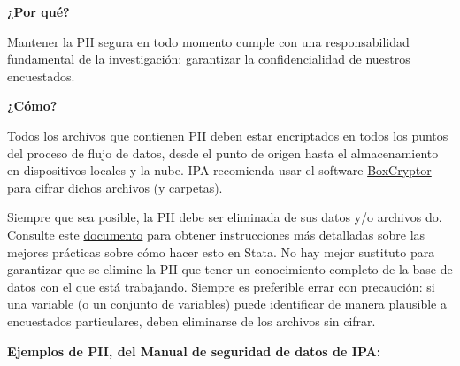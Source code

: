 \documentclass[11pt,en]{elegantpaper}
\begin{document}
\noindent
\textbf{¿Por qué?}

Mantener la PII segura en todo momento cumple con una responsabilidad fundamental de la investigación: garantizar la confidencialidad de nuestros encuestados.

\noindent
\textbf{¿Cómo?} 

Todos los archivos que contienen PII deben estar encriptados en todos los puntos del proceso de flujo de datos, desde el punto de origen hasta el almacenamiento en dispositivos locales y la nube. IPA recomienda usar el software \href{https://www.boxcryptor.com/}{BoxCryptor} para cifrar dichos archivos (y carpetas).

Siempre que sea posible, la PII debe ser eliminada de sus datos y/o archivos do. Consulte este \href{http://www.poverty-action.org/research-transparency/pii-searching}{documento} para obtener instrucciones más detalladas sobre las mejores prácticas sobre cómo hacer esto en Stata. No hay mejor sustituto para garantizar que se elimine la PII que tener un conocimiento completo de la base de datos con el que está trabajando. Siempre es preferible errar con precaución: si una variable (o un conjunto de variables) puede identificar de manera plausible a encuestados particulares, deben eliminarse de los archivos sin cifrar.

\noindent
\textbf{Ejemplos de PII, del Manual de seguridad de datos de IPA:}
\end{document}
